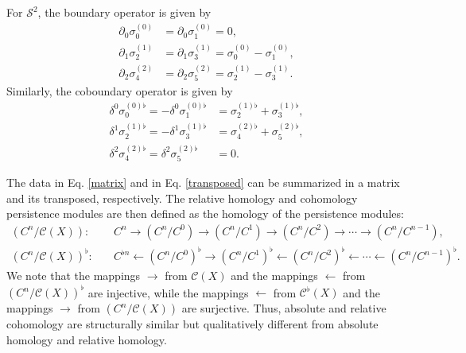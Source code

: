 \begin{example}{\cite[\S 2.6, Example]{de2011dualities}}
	For $\mathcal{S}^{2}$, the boundary operator is given by
	\begin{align}
		\label{matrix}
		\partial_0\sigma^{(0)}_{0} & = \partial_0\sigma^{(0)}_{1} = 0, \nonumber\\
		\partial_1\sigma_{2}^{(1)} & = \partial_1\sigma_{3}^{(1)} = \sigma_{0}^{(0)}-\sigma_{1}^{(0)}, \nonumber\\
		\partial_2\sigma_{4}^{(2)} & = \partial_2\sigma_{5}^{(2)} = \sigma_{2}^{(1)} - \sigma_{3}^{(1)}.
	\end{align}
	Similarly, the coboundary operator is given by
	\begin{align}
		\label{transposed}
		\delta^0\sigma_{0}^{(0)\flat} = -\delta^0\sigma_{1}^{(0)\flat} & = \sigma_{2}^{(1)\flat} + \sigma_{3}^{(1)\flat}, \nonumber\\
		\delta^1\sigma_{2}^{(1)\flat} = -\delta^1\sigma_{3}^{(1)\flat} & = \sigma_{4}^{(2)\flat} + \sigma_{5}^{(2)\flat}, \nonumber\\
		\delta^2\sigma_{4}^{(2)\flat} = \delta^2\sigma_{5}^{(2)\flat}  & = 0.
	\end{align}
\end{example}

The data in Eq. \ref{matrix} and in Eq. \ref{transposed} can be summarized in a matrix and its transposed, respectively. The relative homology and cohomology persistence modules are then defined as the homology of the persistence modules:
	\begin{align*}
		(C^{n}/\mathcal{C}(X)):         & \quad C^{n} \rightarrow (C^{n}/C^{0}) \to (C^{n}/C^{1}) \rightarrow (C^{n}/C^{2}) \rightarrow \cdots \rightarrow (C^{n}/C^{n-1}),                             \\
		(C^{n}/\mathcal{C}(X))^{\flat}: & \quad C^{\flat n} \leftarrow (C^{n}/C^{0})^{\flat} \to (C^{n}/C^{1})^{\flat} \leftarrow (C^{n}/C^{2})^{\flat} \leftarrow \cdots \leftarrow (C^{n}/C^{n-1})^{\flat}.
	\end{align*}
We note that the mappings $\rightarrow$ from $\mathcal{C}(X)$ and the mappings $\leftarrow$ from $(C^{n}/\mathcal{C}(X))^{\flat}$ are injective, while the mappings $\leftarrow$ from $\mathcal{C}^{\flat}(X)$ and the mappings $\rightarrow$ from $(C^{n}/\mathcal{C}(X))$ are surjective. Thus, absolute and relative cohomology are structurally similar but qualitatively different from absolute homology and relative homology.


